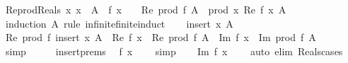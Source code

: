 \begin{isabellebody}
%
\isadelimproof
\isanewline
%
\endisadelimproof
\isanewline
{}\isamarkupfalse%
\ Re{\isacharunderscore}{\kern0pt}prod{\isacharunderscore}{\kern0pt}Reals{\isacharcolon}{\kern0pt}\ {\isachardoublequoteopen}{\isacharparenleft}{\kern0pt}{\isasymAnd}x{\isachardot}{\kern0pt}\ x\ {\isasymin}\ A\ {\isasymLongrightarrow}\ f\ x\ {\isasymin}\ {\isasymreal}{\isacharparenright}{\kern0pt}\ {\isasymLongrightarrow}\ Re\ {\isacharparenleft}{\kern0pt}prod\ f\ A{\isacharparenright}{\kern0pt}\ {\isacharequal}{\kern0pt}\ prod\ {\isacharparenleft}{\kern0pt}{\isasymlambda}x{\isachardot}{\kern0pt}\ Re\ {\isacharparenleft}{\kern0pt}f\ x{\isacharparenright}{\kern0pt}{\isacharparenright}{\kern0pt}\ A{\isachardoublequoteclose}\isanewline
%
\isadelimproof
%
\endisadelimproof
%
\isatagproof
{}\isamarkupfalse%
\ {\isacharparenleft}{\kern0pt}induction\ A\ rule{\isacharcolon}{\kern0pt}\ infinite{\isacharunderscore}{\kern0pt}finite{\isacharunderscore}{\kern0pt}induct{\isacharparenright}{\kern0pt}\isanewline
\ \ \isamarkupfalse%
\ {\isacharparenleft}{\kern0pt}insert\ x\ A{\isacharparenright}{\kern0pt}\isanewline
\ \ \isamarkupfalse%
\ {\isachardoublequoteopen}Re\ {\isacharparenleft}{\kern0pt}prod\ f\ {\isacharparenleft}{\kern0pt}insert\ x\ A{\isacharparenright}{\kern0pt}{\isacharparenright}{\kern0pt}\ {\isacharequal}{\kern0pt}\ Re\ {\isacharparenleft}{\kern0pt}f\ x{\isacharparenright}{\kern0pt}\ {\isacharasterisk}{\kern0pt}\ Re\ {\isacharparenleft}{\kern0pt}prod\ f\ A{\isacharparenright}{\kern0pt}\ {\isacharminus}{\kern0pt}\ Im\ {\isacharparenleft}{\kern0pt}f\ x{\isacharparenright}{\kern0pt}\ {\isacharasterisk}{\kern0pt}\ Im\ {\isacharparenleft}{\kern0pt}prod\ f\ A{\isacharparenright}{\kern0pt}{\isachardoublequoteclose}\isanewline
\ \ \ \ \isamarkupfalse%
\ simp\isanewline
\ \ \isamarkupfalse%
\ \isamarkupfalse%
\ insert{\isachardot}{\kern0pt}prems\ \isamarkupfalse%
\ {\isachardoublequoteopen}f\ x\ {\isasymin}\ {\isasymreal}{\isachardoublequoteclose}\ \isamarkupfalse%
\ simp\isanewline
\ \ \isamarkupfalse%
\ {\isachardoublequoteopen}Im\ {\isacharparenleft}{\kern0pt}f\ x{\isacharparenright}{\kern0pt}\ {\isacharequal}{\kern0pt}\ {}{\isachardoublequoteclose}\ \isamarkupfalse%
\ {\isacharparenleft}{\kern0pt}auto\ elim{\isacharbang}{\kern0pt}{\isacharcolon}{\kern0pt}\ Reals{\isacharunderscore}{\kern0pt}cases{\isacharparenright}{\kern0pt}\isanewline
\ \ \isamarkupfalse%
\ \isamarkupfalse%

\end{isabellebody}
